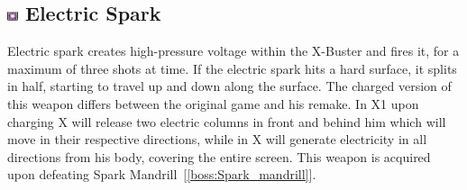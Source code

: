 \subsection{\includegraphics[width=12px, height=10px]{figures/X1/weapons/E_Spark.jpg} Electric Spark}\label{Electric_spark}
Electric spark creates high-pressure voltage within the X-Buster and fires it, for a maximum of three shots at time. If the electric spark hits a hard surface, it splits in half, starting to travel up and down along the surface. The charged version of this weapon differs between the original game and his remake. In X1 upon charging X will release two electric columns in front and behind him which will move in their respective directions, while in \mhx X will generate electricity in all directions from his body, covering the entire screen. This weapon is acquired upon defeating Spark Mandrill~[\ref{boss:Spark_mandrill}].

